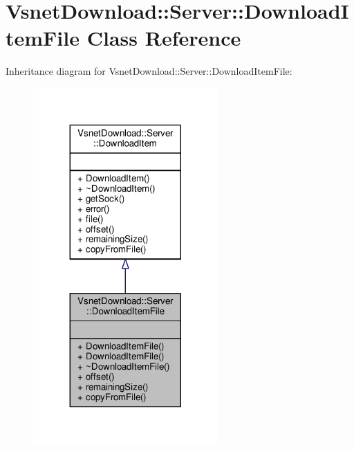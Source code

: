 \hypertarget{classVsnetDownload_1_1Server_1_1DownloadItemFile}{}\section{Vsnet\+Download\+:\+:Server\+:\+:Download\+Item\+File Class Reference}
\label{classVsnetDownload_1_1Server_1_1DownloadItemFile}


Inheritance diagram for Vsnet\+Download\+:\+:Server\+:\+:Download\+Item\+File\+:
\nopagebreak
\begin{figure}[H]
\begin{center}
\leavevmode
\includegraphics[width=200pt]{dc/d20/classVsnetDownload_1_1Server_1_1DownloadItemFile__inherit__graph}
\end{center}
\end{figure}


